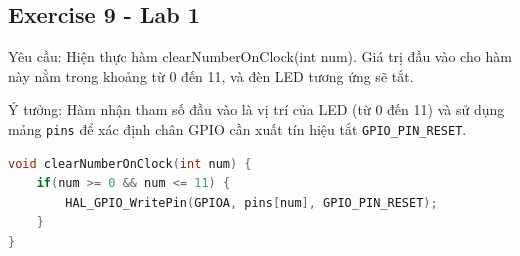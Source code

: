 \subsection{Exercise 9 - Lab 1}
Yêu cầu: Hiện thực hàm clearNumberOnClock(int num). Giá trị đầu vào cho hàm này nằm trong khoảng từ 0 đến 11, và đèn LED tương ứng sẽ tắt.

Ý tưởng: Hàm nhận tham số đầu vào là vị trí của LED (từ 0 đến 11) và sử dụng mảng \texttt{pins} để xác định chân GPIO cần xuất tín hiệu tắt \texttt{GPIO\_PIN\_RESET}.

\begin{lstlisting}[language=C, caption={Hàm clearNumberOnClock}, label={lst:set_number_on_clock}]
void clearNumberOnClock(int num) {
    if(num >= 0 && num <= 11) {
        HAL_GPIO_WritePin(GPIOA, pins[num], GPIO_PIN_RESET);
    }
}
\end{lstlisting}